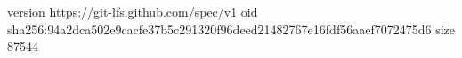 version https://git-lfs.github.com/spec/v1
oid sha256:94a2dca502e9cacfe37b5c291320f96deed21482767e16fdf56aaef7072475d6
size 87544
